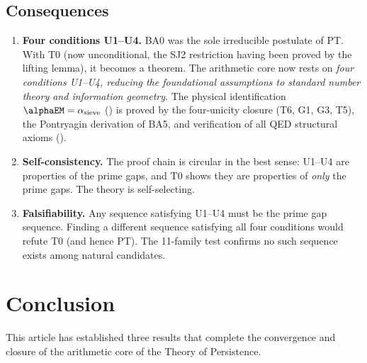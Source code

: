 \documentclass[12pt,a4paper]{article}
\begin{document}
\subsection{Consequences}
\label{sec:ch25_consequences}

\begin{enumerate}
\item \textbf{Four conditions U1--U4.} BA0 was the sole
  irreducible postulate of PT. With T0 (now unconditional, the SJ2
  restriction having been proved by the lifting lemma), it becomes a theorem.
  The arithmetic core now rests on \emph{four conditions U1--U4,
  reducing the foundational assumptions to standard number theory
  and information geometry}.  The physical
  identification $\alphaEM = \alpha_{\rm sieve}$
  (\cite{companion_M5}) is proved by the four-unicity closure
  (T6, G1, G3, T5), the Pontryagin derivation of BA5, and
  verification of all QED structural axioms
  (\cite{companion_physics}).

\item \textbf{Self-consistency.} The proof chain is circular in the
  best sense: U1--U4 are properties of the prime gaps, and T0 shows
  they are properties of \emph{only} the prime gaps. The theory is
  self-selecting.

\item \textbf{Falsifiability.} Any sequence satisfying U1--U4 must
  be the prime gap sequence. Finding a different sequence satisfying
  all four conditions would refute T0 (and hence PT). The 11-family
  test confirms no such sequence exists among natural candidates.
\end{enumerate}


\newpage


\section{Conclusion}
\label{sec:conclusion}

This article has established three results that complete the
convergence and closure of the arithmetic core of the Theory of
Persistence.
\end{document}
